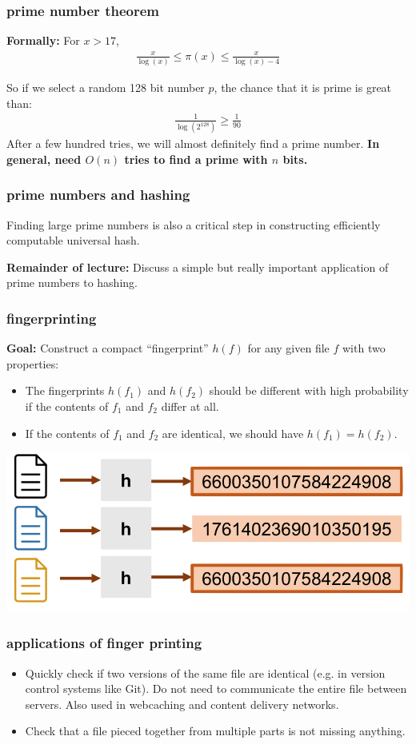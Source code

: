 \documentclass[compress]{beamer}
\begin{document}
\begin{frame}
	\frametitle{prime number theorem}
	\textbf{Formally:}	For $x > 17$,
	\begin{align*}
		\frac{x}{\log(x)} \leq	\pi(x) \leq \frac{x}{\log(x) - 4}
	\end{align*}
	
	So if we select a random 128 bit number $p$, the chance that it is prime is great than:
	\begin{align*}
		\frac{1}{\log(2^{128})} \geq \frac{1}{90}
	\end{align*} 
	After a few hundred tries, we will almost definitely find a prime number. \textbf{In general, need $O(n)$ tries to find a prime with $n$ bits.}
\end{frame}

\begin{frame}
	\frametitle{prime numbers and hashing}
Finding large prime numbers is also a critical step in constructing efficiently computable universal hash. 

\textbf{Remainder of lecture:} Discuss a simple but really important application of prime numbers to hashing.
\end{frame}

\begin{frame}
	\frametitle{fingerprinting}
	\textbf{Goal:} Construct a compact ``fingerprint'' $h(f)$ for any given file $f$ with two properties:
	\begin{itemize}
		\item The fingerprints $h(f_1)$ and $h(f_2)$ should be different with high probability if the contents of $f_1$ and $f_2$ differ at all. 
		\item If the contents of $f_1$ and $f_2$ are identical, we should have $h(f_1) = h(f_2)$.
	\end{itemize}
	\begin{center}
		\includegraphics[width=.75\textwidth]{finger_print.png}
	\end{center}
\end{frame}

\begin{frame}[t]
	\frametitle{applications of finger printing}
	\begin{itemize} 
		\item Quickly check if two versions of the same file are identical (e.g. in version control systems like Git). Do not need to communicate the entire file between servers. Also used in webcaching and content delivery networks. 
		\item Check that a file pieced together from multiple parts is not missing anything. 
	\end{itemize}
	
\end{frame}
\end{document}
